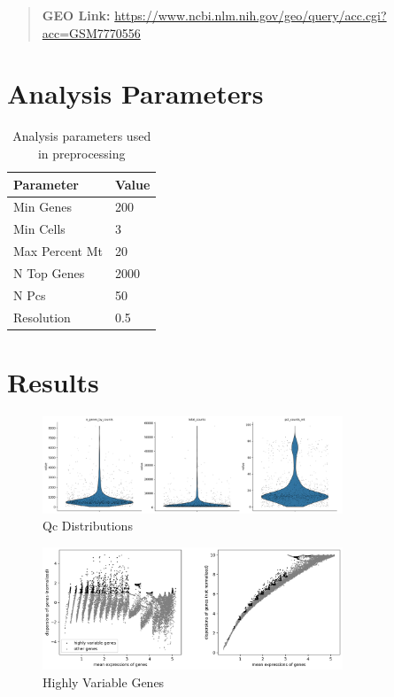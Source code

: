 \documentclass[12pt]{article}
\begin{document}
\begin{quote}
    \textbf{GEO Link:} \url{https://www.ncbi.nlm.nih.gov/geo/query/acc.cgi?acc=GSM7770556}
\end{quote}

\section{Analysis Parameters}
\begin{table}[H]
    \centering
    \begin{tabular}{ll}
        \toprule
        \textbf{Parameter} & \textbf{Value} \\
        \midrule
        Min Genes & 200 \\
        Min Cells & 3 \\
        Max Percent Mt & 20 \\
        N Top Genes & 2000 \\
        N Pcs & 50 \\
        Resolution & 0.5 \\

        \bottomrule
    \end{tabular}
    \caption{Analysis parameters used in preprocessing}
    \label{tab:parameters}
\end{table}

\section{{Results}}

    \begin{figure}[H]
        \centering
        \includegraphics[width=0.8\textwidth]{qc_distributions.png}
        \caption{Qc Distributions}
        \label{fig:qc_distributions}
    \end{figure}
    \newpage

    \begin{figure}[H]
        \centering
        \includegraphics[width=0.8\textwidth]{highly_variable_genes.png}
        \caption{Highly Variable Genes}
        \label{fig:highly_variable_genes}
    \end{figure}
    \newpage
\end{document}
